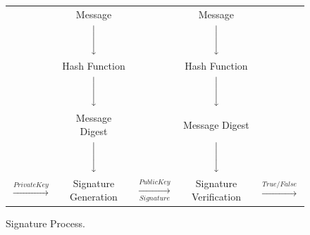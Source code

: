 \begin{figure}[H]
	\centering
	\renewcommand{\arraystretch}{2}
	\begin{tabular}{ccccc}
		\cline{2-2}\cline{4-4}
		 & \multicolumn{1}{|c|}{Message} &  &
		\multicolumn{1}{|c|}{Message}& \\
		\cline{2-2}\cline{4-4}
		 & $\Bigg\downarrow$ & & $\Bigg\downarrow$& \\
		\cline{2-2}\cline{4-4}
		 & \multicolumn{1}{|c|}{Hash Function} &  &
		\multicolumn{1}{|c|}{Hash Function}& \\
		\cline{2-2}\cline{4-4}
		 & $\Bigg\downarrow$ & & $\Bigg\downarrow$& \\
		\cline{2-2}\cline{4-4}
		 & \multicolumn{1}{|c|}{Message Digest} &  &
		\multicolumn{1}{|c|}{Message Digest}& \\
		\cline{2-2}\cline{4-4}
		 & $\Bigg\downarrow$ & & $\Bigg\downarrow$& \\
		\cline{2-2}\cline{4-4}
		$\xrightarrow{Private Key}$ & \multicolumn{1}{|c|}{Signature Generation} & $\xrightarrow[Signature]{Public Key}$&
		\multicolumn{1}{|c|}{Signature Verification}& $\xrightarrow{True/False}$\\
		\cline{2-2}\cline{4-4}
	\end{tabular}
\caption{Signature Process.}
\label{SigProt}
\end{figure}
